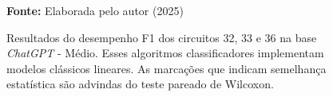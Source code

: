 \begin{figure}
\caption{Resultados do desempenho F1 dos circuitos 32, 33 e 36 na base \textit{ChatGPT} - Médio. Esses algoritmos classificadores implementam modelos clássicos lineares. As marcações que indicam semelhança estatística são advindas do teste pareado de Wilcoxon.}
\label{fig:f1:medium:g4}
     \centering
    \centering

      \par\medskip\ABNTEXfontereduzida\selectfont\textbf{Fonte:} Elaborada pelo autor (2025) \par\medskip
\end{figure}